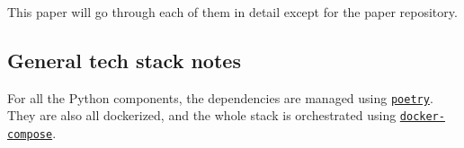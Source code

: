 This paper will go through each of them in detail except for the paper repository.






















\subsection{General tech stack notes} \label{ssec:general-tech-stack-notes}

For all the Python components, the dependencies are managed using \href{https://github.com/python-poetry/poetry}{\texttt{poetry}}. They are also all dockerized, and the whole stack is orchestrated using \href{https://docs.docker.com/compose/}{\texttt{docker-compose}}.
